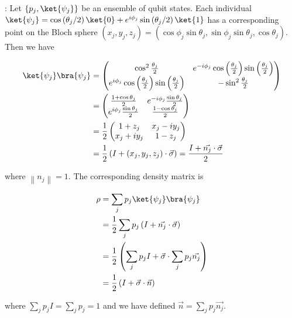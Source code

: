 : Let $\{p_j, \ket{\psi_j}\}$ be an ensemble of qubit states.
Each individual $\ket{\psi_j} = \cos \left( \theta_j / 2 \right) \ket{0} + e^{i
\phi_j} \sin \left( \theta_j / 2 \right) \ket{1}$ has a corresponding point on
the Bloch sphere $\left( x_j, y_j, z_j \right) = \left( \cos \phi_j \sin
\theta_j, \sin \phi_j \sin \theta_j, \cos \theta_j \right)$. Then we have

\begin{align}
\ket{\psi_j} \bra{\psi_j} &= \begin{pmatrix} \cos^2 \frac{\theta_j}{2} & e^{-i
\phi_j} \cos \left( \frac{\theta_j}{2} \right) \sin \left( \frac{\theta_j}{2}
\right) \\ e^{i \phi_j} \cos \left( \frac{\theta_j}{2} \right) \sin \left(
\frac{\theta_j}{2} \right) & -\sin^2 \frac{\theta_j}{2} \end{pmatrix} \\
&= \begin{pmatrix} \frac{1 + \cos \theta_j}{2} & e^{-i \phi_j} \frac{\sin
\theta_j}{2} \\ e^{i \phi_j} \frac{\sin \theta_j}{2}  & \frac{1 - \cos
\theta_j}{2} \end{pmatrix} \\
&= \frac{1}{2} \begin{pmatrix} 1 + z_j & x_j - i y_j \\ x_j + i y_j & 1 - z_j
\end{pmatrix} \\
&= \frac{1}{2} \left( I + \left( x_j, y_j, z_j \right) \cdot \vec{\sigma}
\right) = \frac{I + \vec{n_j} \cdot \vec{\sigma}}{2}
\end{align}

where $\left\lVert n_j \right\rVert = 1$. The corresponding density matrix is

\begin{align}
\rho &= \sum_j{p_j \ket{\psi_j} \bra{\psi_j}} \\
&= \frac{1}{2} \sum_j{p_j \left( I + \vec{n_j} \cdot \vec{\sigma} \right)} \\
&= \frac{1}{2} \left( \sum_j{p_j I} + \vec{\sigma} \cdot \sum_j{p_j \vec{n_j}}
\right) \\
&= \frac{1}{2} \left(I + \vec{\sigma} \cdot \vec{n} \right)
\end{align}

where $\sum_j{p_j I} = \sum_j{p_j} = 1$ and we have defined $\vec{n} =
\sum_j{p_j \vec{n_j}}$.

